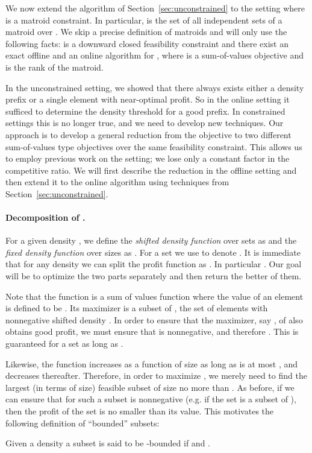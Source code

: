 We now extend the algorithm of Section~\ref{sec:unconstrained} to the
setting  where  is a matroid constraint. In
particular,  is the set of all independent sets of a matroid
over . We skip a precise definition of matroids and will only use the following facts:  is a downward closed feasibility constraint and there exist an exact offline and an  online algorithm for
, where  is a sum-of-values objective and  is the rank of the matroid. 

In the unconstrained setting, we showed that there always exists either a density prefix or a single element with near-optimal profit. So in the online setting it sufficed to determine the density threshold for a good prefix. In constrained settings this is no longer true, and we need to develop new techniques. Our approach is to develop a general reduction from the  objective to two different sum-of-values type objectives over the same feasibility constraint. This allows us to employ previous work on the  setting; we lose only a constant factor in the competitive ratio. We will first describe the reduction in the offline setting and then extend it to the online algorithm using techniques from Section~\ref{sec:unconstrained}.

\paragraph{Decomposition of .}

For a given density , we define the {\em shifted density
function}  over sets as  and the {\em
fixed density function}  over sizes as
. For a set  we use
 to denote . It is immediate that
for any density  we can split the profit function as
. In particular
. Our goal
will be to optimize the two parts separately and then return the
better of them.

Note that the function  is a sum of values function
where the value of an element is defined to be . Its maximizer is a subset of , the set of elements
with nonnegative shifted density . In order to ensure
that the maximizer, say , of  also obtains good
profit, we must ensure that  is nonnegative, and
therefore . This is guaranteed for a
set  as long as .

Likewise, the function  increases as a function of size
 as long as  is at most , and decreases
thereafter. Therefore, in order to maximize , we merely
need to find the largest (in terms of size) feasible subset of size no
more than . As before, if we can ensure that for
such a subset  is nonnegative (e.g. if the set is a
subset of ), then the profit of the set is no smaller than
its  value. This motivates the following definition of
``bounded'' subsets:
\begin{definition}
\label{def:bounded}
Given a density  a subset  is said to be -bounded if  and .
\end{definition}
 
